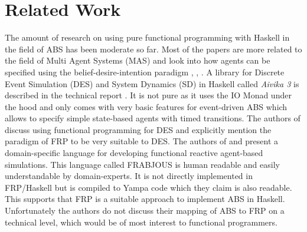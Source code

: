 \section{Related Work}
\label{sec:related_work}
The amount of research on using pure functional programming with Haskell in the field of ABS has been moderate so far. Most of the papers are more related to the field of Multi Agent Systems (MAS) and look into how agents can be specified using the belief-desire-intention paradigm \cite{de_jong_suitability_2014}, \cite{sulzmann_specifying_2007}, \cite{jankovic_functional_2007}. A library for Discrete Event Simulation (DES) and System Dynamics (SD) in Haskell called \textit{Aivika 3} is described in the technical report \cite{sorokin_aivika_2015}. It is not pure as it uses the IO Monad under the hood and only comes with very basic features for event-driven ABS which allows to specify simple state-based agents with timed transitions. The authors of \cite{jankovic_functional_2007} discuss using functional programming for DES and explicitly mention the paradigm of FRP to be very suitable to DES. The authors of \cite{schneider_towards_2012} and \cite{vendrov_frabjous:_2014} present a domain-specific language for developing functional reactive agent-based simulations. This language called FRABJOUS is human readable and easily understandable by domain-experts. It is not directly implemented in FRP/Haskell but is compiled to Yampa code which they claim is also readable. This supports that FRP is a suitable approach to implement ABS in Haskell. Unfortunately the authors do not discuss their mapping of ABS to FRP on a technical level, which would be of most interest to functional programmers.
